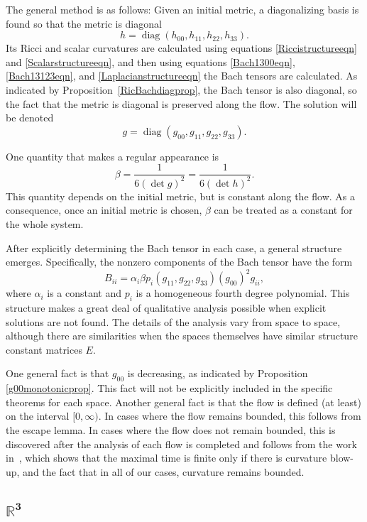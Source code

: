 \documentclass[pdftex]{sigma}
\numberwithin{equation}{section}
\newcommand{\diag}{\operatorname{diag}} %
\begin{document}
The general method is as follows: Given an initial metric, a diagonalizing basis is found so that the metric is diagonal
\[
h = \diag(h_{00}, h_{11}, h_{22}, h_{33}).
\]
Its Ricci and scalar curvatures are calculated using equations \eqref{Riccistructureeqn} and \eqref{Scalarstructureeqn}, and then using equations \eqref{Bach1300eqn}, \eqref{Bach13123eqn}, and \eqref{Laplacianstructureeqn} the Bach tensors are calculated. As indicated by Proposition~\ref{RicBachdiagprop}, the Bach tensor is also diagonal, so the fact that the metric is diagonal is preserved along the flow. The solution will be denoted
\[
g = \diag(g_{00}, g_{11}, g_{22}, g_{33}).
\]

One quantity that makes a regular appearance is
\[
\beta = \frac{1}{6 (\det g)^2} = \frac{1}{6 (\det h)^2}.
\]
This quantity depends on the initial metric, but is constant along the flow. As a consequence, once an initial metric is chosen, $\beta$ can be treated as a constant for the whole system.

After explicitly determining the Bach tensor in each case, a general structure emerges. Speci\-fi\-cally, the nonzero components of the Bach tensor have the form
\[
B_{ii} = \alpha_i \beta p_{i}(g_{11}, g_{22}, g_{33}) (g_{00})^2 g_{ii},
\]
where $\alpha_i$ is a constant and $p_{i}$ is a homogeneous fourth degree polynomial.
This structure makes a great deal of qualitative analysis possible when explicit solutions are not found. The details of the analysis vary from space to space, although there are similarities when the spaces themselves have similar structure constant matrices $E$.

%
%
One general fact is that $g_{00}$ is decreasing, as indicated by Proposition \ref{g00monotonicprop}. This fact will not be explicitly included in the specific theorems for each space. Another general fact is that the flow is defined (at least) on the interval $[0, \infty)$. In cases where the flow remains bounded, this follows from the escape lemma. In cases where the flow does not remain bounded, this is discovered after the analysis of each flow is completed and follows from the work in~\cite{Lopez}, which shows that the maximal time is finite only if there is curvature blow-up, and the fact that in all of our cases, curvature remains bounded.

\subsection[$\mathbb{R}^3$]{$\boldsymbol{\mathbb{R}^3}$} \label{r3subsection}
\end{document}
